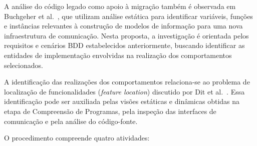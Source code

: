 A análise do código legado como apoio à migração também é observada em Buchgeher et al.~\cite{BUCHGEHER2022276}, que utilizam análise estática para identificar variáveis, funções e instâncias relevantes à construção de modelos de informação para uma nova infraestrutura de comunicação. Nesta proposta, a investigação é orientada pelos requisitos e cenários BDD estabelecidos anteriormente, buscando identificar as entidades de implementação envolvidas na realização dos comportamentos selecionados.

A identificação das realizações dos comportamentos relaciona-se ao problema de localização de funcionalidades (\textit{feature location}) discutido por Dit et al.~\cite{Dit2013}. Essa identificação pode ser auxiliada pelas visões estáticas e dinâmicas obtidas na etapa de Compreensão de Programas, pela inspeção das interfaces de comunicação e pela análise do código-fonte.

O procedimento compreende quatro atividades:

